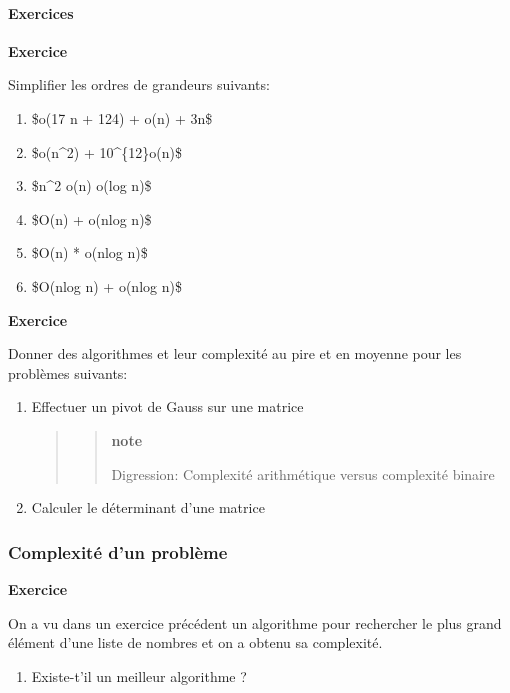 \paragraph{Exercices}

\textbf{Exercice}

Simplifier les ordres de grandeurs suivants:

\begin{enumerate}
\item
  \$o(17 n + 124) + o(n) + 3n\$
\item
  \$o(n\^{}2) + 10\^{}\{12\}o(n)\$
\item
  \$n\^{}2 o(n) o(log n)\$
\item
  \$O(n) + o(nlog n)\$
\item
  \$O(n) * o(nlog n)\$
\item
  \$O(nlog n) + o(nlog n)\$
\end{enumerate}

\textbf{Exercice}

Donner des algorithmes et leur complexité au pire et en moyenne pour les
problèmes suivants:

\begin{enumerate}
\item
  Effectuer un pivot de Gauss sur une matrice

  \begin{quote}
  \begin{quote}
  \textbf{note}

  Digression: Complexité arithmétique versus complexité binaire
  \end{quote}
  \end{quote}
\item
  Calculer le déterminant d'une matrice
\end{enumerate}

\subsubsection{Complexité d'un problème}

\textbf{Exercice}

On a vu dans un exercice précédent un algorithme pour rechercher le plus
grand élément d'une liste de nombres et on a obtenu sa complexité.

\begin{enumerate}
\itemsep1pt\parskip0pt
\item
  Existe-t'il un meilleur algorithme ?
\end{enumerate}

